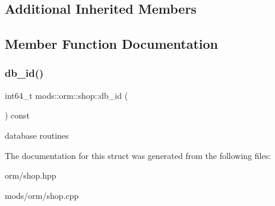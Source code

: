 \subsection*{Additional Inherited Members}


\subsection{Member Function Documentation}
\mbox{\label{structmods_1_1orm_1_1shop_a696c01543bff9b376b37136834c5c285}} 
\subsubsection{\texorpdfstring{db\+\_\+id()}{db\_id()}}
{\footnotesize\ttfamily int64\+\_\+t mods\+::orm\+::shop\+::db\+\_\+id (\begin{DoxyParamCaption}{ }\end{DoxyParamCaption}) const}

database routines 

The documentation for this struct was generated from the following files\+:\begin{DoxyCompactItemize}
\item 
orm/shop.\+hpp\item 
mods/orm/shop.\+cpp\end{DoxyCompactItemize}

